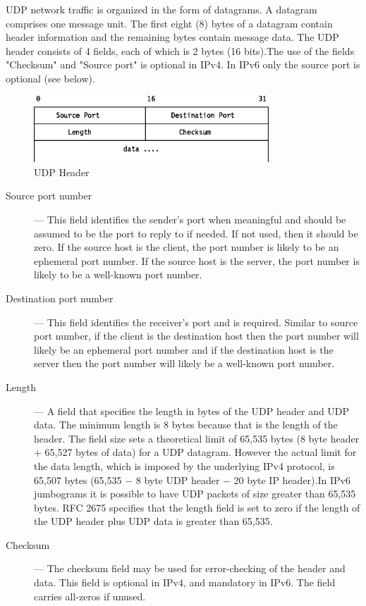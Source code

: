 \documentclass[12pt]{article}
\theoremstyle{definition}
\begin{document}
			UDP network traffic is organized in the form of datagrams. A datagram comprises one message unit. The first eight (8) bytes of a datagram contain header information and the remaining bytes contain message data.
			The UDP header consists of 4 fields, each of which is 2 bytes (16 bits).The use of the fields "Checksum" and "Source port" is optional in IPv4. In IPv6 only the source port is optional (see below).
			
			\begin{figure}[!h]
				\centering
				\includegraphics[width=250pt]{pictures/udp_header.png}
				\caption{UDP Header}
				\label{fig:udp-header}
			\end{figure}
		
			\begin{description}
				\item [Source port number] ---
				This field identifies the sender's port when meaningful and should be assumed to be the port to reply to if needed. If not used, then it should be zero. If the source host is the client, the port number is likely to be an ephemeral port number. If the source host is the server, the port number is likely to be a well-known port number.
				
				\item [Destination port number] ---
				This field identifies the receiver's port and is required. Similar to source port number, if the client is the destination host then the port number will likely be an ephemeral port number and if the destination host is the server then the port number will likely be a well-known port number.
				
				\item [Length] ---
				A field that specifies the length in bytes of the UDP header and UDP data. The minimum length is 8 bytes because that is the length of the header. The field size sets a theoretical limit of 65,535 bytes (8 byte header + 65,527 bytes of data) for a UDP datagram. However the actual limit for the data length, which is imposed by the underlying IPv4 protocol, is 65,507 bytes (65,535 − 8 byte UDP header − 20 byte IP header).In IPv6 jumbograms it is possible to have UDP packets of size greater than 65,535 bytes. RFC 2675 specifies that the length field is set to zero if the length of the UDP header plus UDP data is greater than 65,535.
				
				\item[Checksum] ---
				The checksum field may be used for error-checking of the header and data. This field is optional in IPv4, and mandatory in IPv6. The field carries all-zeros if unused.
			\end{description}
		
\end{document}

